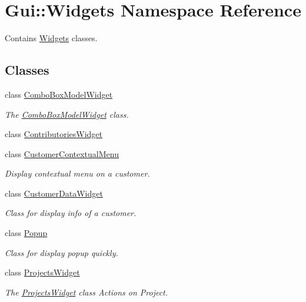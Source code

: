 \hypertarget{namespaceGui_1_1Widgets}{\section{Gui\-:\-:Widgets Namespace Reference}
\label{namespaceGui_1_1Widgets}
}


Contains \hyperlink{namespaceGui_1_1Widgets}{Widgets} classes.  


\subsection*{Classes}
\begin{DoxyCompactItemize}
\item 
class \hyperlink{classGui_1_1Widgets_1_1ComboBoxModelWidget}{Combo\-Box\-Model\-Widget}
\begin{DoxyCompactList}\small\item\em The \hyperlink{classGui_1_1Widgets_1_1ComboBoxModelWidget}{Combo\-Box\-Model\-Widget} class. \end{DoxyCompactList}\item 
class \hyperlink{classGui_1_1Widgets_1_1ContributoriesWidget}{Contributories\-Widget}
\item 
class \hyperlink{classGui_1_1Widgets_1_1CustomerContextualMenu}{Customer\-Contextual\-Menu}
\begin{DoxyCompactList}\small\item\em Display contextual menu on a customer. \end{DoxyCompactList}\item 
class \hyperlink{classGui_1_1Widgets_1_1CustomerDataWidget}{Customer\-Data\-Widget}
\begin{DoxyCompactList}\small\item\em Class for display info of a customer. \end{DoxyCompactList}\item 
class \hyperlink{classGui_1_1Widgets_1_1Popup}{Popup}
\begin{DoxyCompactList}\small\item\em Class for display popup quickly. \end{DoxyCompactList}\item 
class \hyperlink{classGui_1_1Widgets_1_1ProjectsWidget}{Projects\-Widget}
\begin{DoxyCompactList}\small\item\em The \hyperlink{classGui_1_1Widgets_1_1ProjectsWidget}{Projects\-Widget} class Actions on Project. \end{DoxyCompactList}\item 

\end{DoxyCompactItemize}
